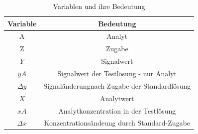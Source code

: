 \renewcommand{\arraystretch}{1.2}
\begin{table}[h!]
	\centering
	\caption{Variablen und ihre Bedeutung}
	\label{tab:variablen}
			\begin{tabular}{c|c}
				\hline
				\textbf{Variable}&\textbf{Bedeutung} \\
				\hline
				A& Analyt \\
				Z& Zugabe\\
				$Y$& Signalwert\\
				$yA$& Signalwert der Testlösung - nur Analyt\\
				$\Delta y$& Signaländerungnach Zugabe der Standardlösung \\
				$X$& Analytwert\\
				$xA$&Analytkonzentration in der Testlösung\\
				$\Delta x$& Konzentrationsändeung durch Standard-Zugabe \\
				\hline	
			\end{tabular}
		\end{table}
		\FloatBarrier
		\vspace*{-2.5mm}

